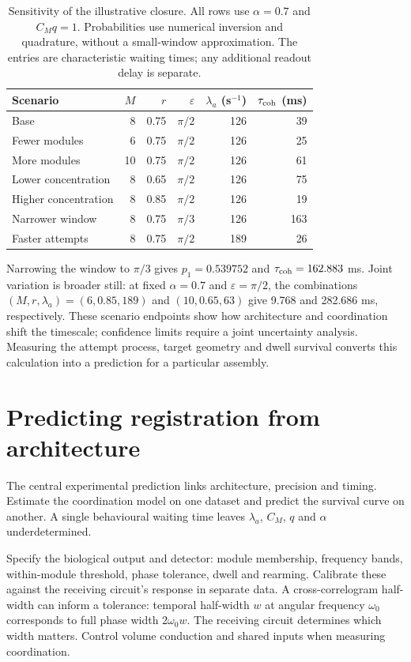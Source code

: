 \documentclass[11pt]{article}
\begin{document}
\begin{table}[tb]
\centering
\caption{Sensitivity of the illustrative closure. All rows use
$\alpha=0.7$ and $C_Mq=1$. Probabilities use numerical inversion and
quadrature, without a small-window approximation. The entries are
characteristic waiting times; any additional readout delay is separate.}
\label{tab:sensitivity}
\begin{tabular}{lrrrrr}
\toprule
Scenario & $M$ & $r$ & $\varepsilon$ &
$\lambda_a$ (s$^{-1}$) & $\tau_{\rm coh}$ (ms)\\
\midrule
Base & 8 & 0.75 & $\pi/2$ & 126 & 39\\
Fewer modules & 6 & 0.75 & $\pi/2$ & 126 & 25\\
More modules & 10 & 0.75 & $\pi/2$ & 126 & 61\\
Lower concentration & 8 & 0.65 & $\pi/2$ & 126 & 75\\
Higher concentration & 8 & 0.85 & $\pi/2$ & 126 & 19\\
Narrower window & 8 & 0.75 & $\pi/3$ & 126 & 163\\
Faster attempts & 8 & 0.75 & $\pi/2$ & 189 & 26\\
\bottomrule
\end{tabular}
\end{table}

Narrowing the window to $\pi/3$ gives $p_1=0.539752$ and
$\tau_{\rm coh}=162.883$ ms. Joint variation is broader still:
at fixed $\alpha=0.7$ and $\varepsilon=\pi/2$, the combinations
$(M,r,\lambda_a)=(6,0.85,189)$ and $(10,0.65,63)$ give 9.768
and 282.686 ms, respectively. These scenario endpoints show how
architecture and coordination shift the timescale; confidence limits
require a joint uncertainty analysis. Measuring the attempt process,
target geometry and dwell survival converts this calculation into a
prediction for a particular assembly.

\section{Predicting registration from architecture}

The central experimental prediction links architecture, precision and
timing. Estimate the coordination model on one dataset and predict the
survival curve on another. A single behavioural waiting time leaves
$\lambda_a$, $C_M$, $q$ and $\alpha$ underdetermined.

Specify the biological output and detector: module membership, frequency
bands, within-module threshold, phase tolerance, dwell and rearming.
Calibrate these against the receiving circuit's response in separate data.
A cross-correlogram half-width can inform a tolerance: temporal half-width
$w$ at angular frequency $\omega_0$ corresponds to full phase width
$2\omega_0 w$. The receiving circuit determines which width matters.
Control volume conduction and shared inputs when measuring coordination.
\end{document}
